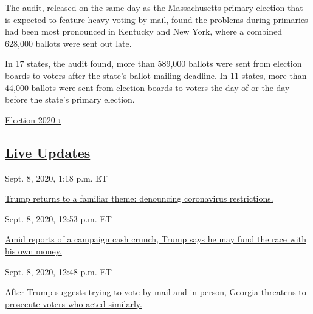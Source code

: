 The audit, released on the same day as the
\href{https://www.nytimes3xbfgragh.onion/interactive/2020/09/01/us/elections/results-massachusetts-primary-elections.html}{Massachusetts
primary election} that is expected to feature heavy voting by mail,
found the problems during primaries had been most pronounced in Kentucky
and New York, where a combined 628,000 ballots were sent out late.

In 17 states, the audit found, more than 589,000 ballots were sent from
election boards to voters after the state's ballot mailing deadline. In
11 states, more than 44,000 ballots were sent from election boards to
voters the day of or the day before the state's primary election.

\href{https://www.nytimes3xbfgragh.onion/news-event/2020-election}{Election
2020 ›}

\hypertarget{live-updates}{%
\subsection{\texorpdfstring{\href{https://www.nytimes3xbfgragh.onion/live/2020/09/08/us/trump-vs-biden}{Live
Updates}}{Live Updates}}\label{live-updates}}

\href{https://www.nytimes3xbfgragh.onion/live/2020/09/08/us/trump-vs-biden\#trump-returns-to-a-familiar-theme-denouncing-coronavirus-restrictions}{}

Sept. 8, 2020, 1:18 p.m. ET

\href{https://www.nytimes3xbfgragh.onion/live/2020/09/08/us/trump-vs-biden\#trump-returns-to-a-familiar-theme-denouncing-coronavirus-restrictions}{Trump
returns to a familiar theme: denouncing coronavirus
restrictions.}\href{https://www.nytimes3xbfgragh.onion/live/2020/09/08/us/trump-vs-biden\#amid-reports-of-a-campaign-cash-crunch-trump-says-he-may-fund-the-race-with-his-own-money}{}

Sept. 8, 2020, 12:53 p.m. ET

\href{https://www.nytimes3xbfgragh.onion/live/2020/09/08/us/trump-vs-biden\#amid-reports-of-a-campaign-cash-crunch-trump-says-he-may-fund-the-race-with-his-own-money}{Amid
reports of a campaign cash crunch, Trump says he may fund the race with
his own
money.}\href{https://www.nytimes3xbfgragh.onion/live/2020/09/08/us/trump-vs-biden\#after-trump-suggests-trying-to-vote-by-mail-and-in-person-georgia-threatens-to-prosecute-voters-who-acted-similarly}{}

Sept. 8, 2020, 12:48 p.m. ET

\href{https://www.nytimes3xbfgragh.onion/live/2020/09/08/us/trump-vs-biden\#after-trump-suggests-trying-to-vote-by-mail-and-in-person-georgia-threatens-to-prosecute-voters-who-acted-similarly}{After
Trump suggests trying to vote by mail and in person, Georgia threatens
to prosecute voters who acted similarly.}

